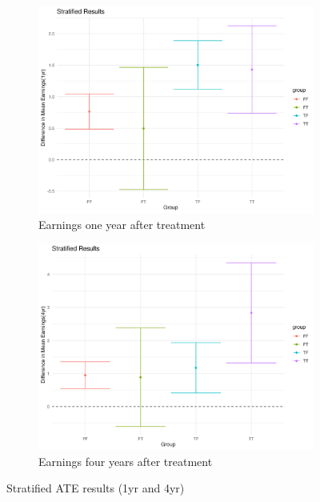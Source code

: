 \documentclass[11pt]{article}
\numberwithin{equation}{section}
\begin{document}
\begin{figure}[h]
    \centering
    \begin{subfigure}{0.48\textwidth}
    \includegraphics[width=\textwidth]{output/stratified_results_1yr.png}
    \caption{\label{fig:stratified_results_1yr}Earnings one year after treatment}
    \end{subfigure}
    \begin{subfigure}{0.48\textwidth}
    \includegraphics[width=\textwidth]{output/stratified_results_4yr.png}
    \caption{\label{fig:stratified_results_4yr}Earnings four years after treatment}
    \end{subfigure}
    \caption{\label{fig:stratified_results}Stratified ATE results (1yr and 4yr)}
\end{figure}
\end{document}
